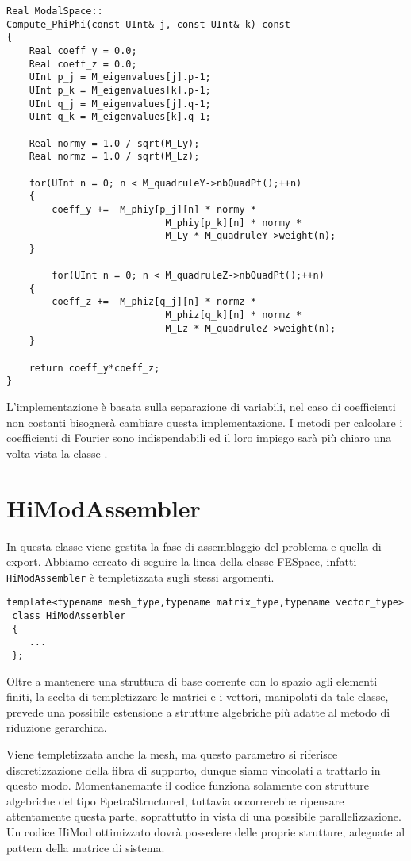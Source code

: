 \begin{lstlisting}[style = general]
Real ModalSpace::
Compute_PhiPhi(const UInt& j, const UInt& k) const
{
	Real coeff_y = 0.0;
	Real coeff_z = 0.0;
	UInt p_j = M_eigenvalues[j].p-1;
	UInt p_k = M_eigenvalues[k].p-1;
	UInt q_j = M_eigenvalues[j].q-1;
	UInt q_k = M_eigenvalues[k].q-1;
	
	Real normy = 1.0 / sqrt(M_Ly);
	Real normz = 1.0 / sqrt(M_Lz);
	
	for(UInt n = 0; n < M_quadruleY->nbQuadPt();++n)
	{
		coeff_y +=	M_phiy[p_j][n] * normy *	
							M_phiy[p_k][n] * normy *
							M_Ly * M_quadruleY->weight(n);
	}
	
		for(UInt n = 0; n < M_quadruleZ->nbQuadPt();++n)
	{
		coeff_z +=	M_phiz[q_j][n] * normz *	
							M_phiz[q_k][n] * normz *
							M_Lz * M_quadruleZ->weight(n);
	}
	
	return coeff_y*coeff_z;
}
\end{lstlisting}
 L'implementazione \`e basata sulla separazione di variabili, nel caso di coefficienti non costanti bisogner\`a cambiare
 questa implementazione.
 I metodi per calcolare i coefficienti di Fourier sono indispendabili 
 ed il loro impiego sar\`a pi\`u chiaro una volta vista la classe .
 
\section{HiModAssembler}
 
 In questa classe viene gestita la fase di assemblaggio del problema e quella di export. Abbiamo cercato di seguire la linea della classe 
FESpace, infatti \texttt{HiModAssembler} \`e templetizzata sugli stessi argomenti. 

 \begin{lstlisting}[style = general]
 template<typename mesh_type,typename matrix_type,typename vector_type>
 class HiModAssembler
 {
	... 
 };
 \end{lstlisting} 
Oltre a mantenere una struttura di base coerente con lo 
spazio agli elementi finiti, la scelta di templetizzare le matrici e i vettori, manipolati da tale classe, prevede una possibile estensione a strutture algebriche pi\`u adatte al metodo di riduzione gerarchica. 
 
 Viene templetizzata anche la mesh, ma questo parametro si riferisce discretizzazione della fibra di supporto, dunque siamo vincolati a 
trattarlo in questo modo.
 Momentanemante il codice funziona solamente con strutture algebriche del tipo EpetraStructured, tuttavia occorrerebbe ripensare attentamente questa parte, 
soprattutto in vista di una possibile parallelizzazione.
Un codice HiMod ottimizzato dovr\`a possedere delle proprie strutture, adeguate al pattern della matrice di sistema.


